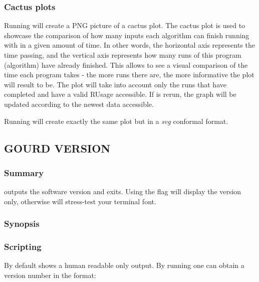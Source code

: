 \documentclass[a4paper,english]{article}
\begin{document}
\begin{adjustwidth}{18pt}{0pt}
            \subsubsection{Cactus plots}
                Running    will create a PNG picture of
                a cactus plot.
                The cactus plot is used to showcase the comparison of how many inputs each algorithm
                can finish running with in a given amount of time.
                In other words, the horizontal axis represents the time passing, and the vertical axis
                represents how many runs of this program (algorithm) have already finished.
                This allows to see a visual comparison of the time each program takes - the more runs
                there are, the more informative the plot will result to be.
                The plot will take into account only the runs that have completed and have a valid
                RUsage accessible. If   is rerun, the graph will be updated
                according to the newest data accessible.

                Running    will create exactly the same
                plot but in a \emph{svg} conformal format.

        \subsection{GOURD VERSION}

            \subsubsection{Summary}
                  outputs the software version and exits.
                Using the  flag will display the version only, otherwise 
                will stress-test your terminal font.

            \subsubsection{Synopsis}
                  

            \subsubsection{Scripting}
                By default   shows a human readable only output. By
                running    one can obtain a version number
                in the format:


\end{adjustwidth}
\end{document}
